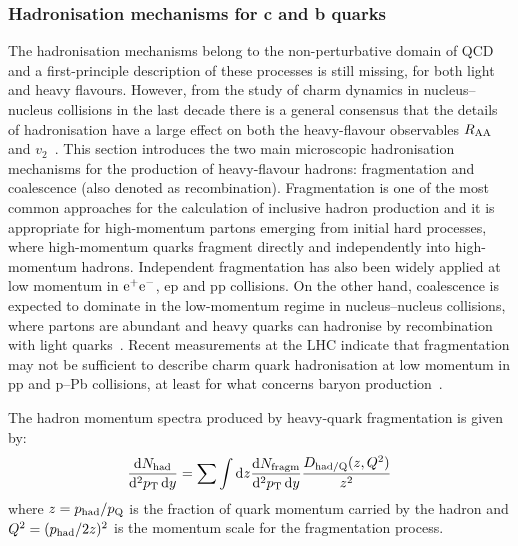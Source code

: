 \subsubsection{Hadronisation mechanisms for c and b quarks}
\label{sec:HFhadro1}


The hadronisation mechanisms belong to the non-perturbative domain of QCD and a
first-principle description of these processes is still missing, for both light and heavy flavours.
However, from the study of charm dynamics in nucleus--nucleus collisions in the last decade
there is a general consensus that the details of hadronisation have a large effect on both the heavy-flavour observables 
$R_{\rm AA}$ and $v_2$~\cite{Dong:2018ntm,Rapp:2018qla,Scardina:2017ipo}.
This section introduces 
the two main microscopic hadronisation mechanisms for the production of heavy-flavour hadrons: fragmentation and coalescence (also denoted as recombination).
Fragmentation is one of the most common approaches for the calculation of inclusive hadron production and it is appropriate
for high-momentum partons emerging
from initial hard processes, where high-momentum quarks fragment directly and independently into high-momentum hadrons. Independent fragmentation has also been widely applied at low momentum in $\rm e^+e^-$, ep and pp collisions.
On the other hand, coalescence is expected to dominate in the low-momentum regime in nucleus--nucleus collisions, where partons are abundant and heavy quarks
can hadronise by recombination with light quarks~\cite{Fries:2008hs}. Recent measurements at the LHC indicate that fragmentation may not be sufficient to 
describe charm quark hadronisation at low momentum in pp and p--Pb collisions, at least
for what concerns baryon production~\cite{Acharya:2017kfy,Acharya:2017lwf}.

The hadron momentum spectra produced by heavy-quark fragmentation is given by:
\begin{equation}
\frac{{\rm d}N_{\rm had}}{{\rm d}^{2}p\sb{\scriptstyle\mathrm{T}}\,{\rm d} y}=\sum \int {\rm d} z \frac{{\rm d} N_{\rm fragm}}{{\rm d}^{2}p\sb{\scriptstyle\mathrm{T}}\, {\rm d} y} \frac{D_{\rm had/Q}(z,Q^{2})}{z^{2}} 
\label{Eq:frag}
\end{equation}
where $z=p_{\rm had}/p_{\rm Q}$ is the fraction of quark momentum carried by the hadron and $Q^2=(p_{\rm had}/2 z)^2$ 
is the momentum scale for the fragmentation process.

